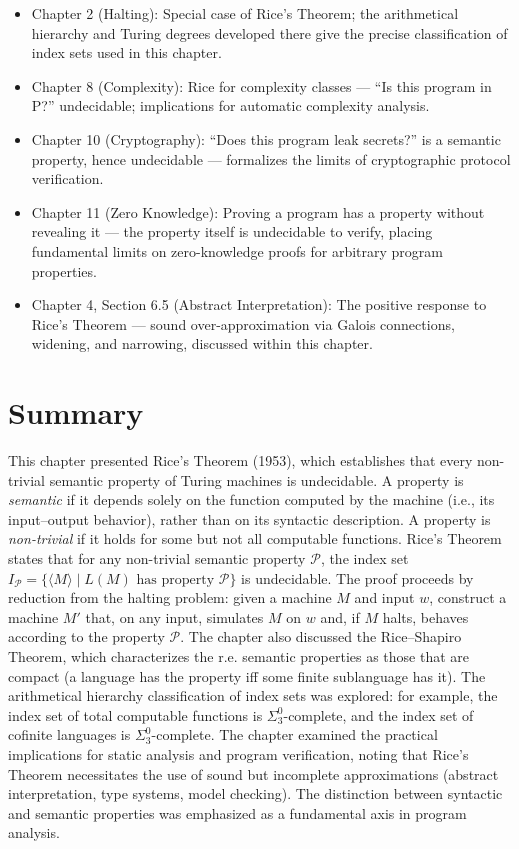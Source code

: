\begin{itemize}
\item Chapter 2 (Halting): Special case of Rice's Theorem; the arithmetical hierarchy and Turing degrees developed there give the precise classification of index sets used in this chapter.
\item Chapter 8 (Complexity): Rice for complexity classes --- ``Is this program in P?'' undecidable; implications for automatic complexity analysis.
\item Chapter 10 (Cryptography): ``Does this program leak secrets?'' is a semantic property, hence undecidable --- formalizes the limits of cryptographic protocol verification.
\item Chapter 11 (Zero Knowledge): Proving a program has a property without revealing it --- the property itself is undecidable to verify, placing fundamental limits on zero-knowledge proofs for arbitrary program properties.
\item Chapter 4, Section 6.5 (Abstract Interpretation): The positive response to Rice's Theorem --- sound over-approximation via Galois connections, widening, and narrowing, discussed within this chapter.
\end{itemize}

\section{Summary}
\label{sec:rice:summary}

This chapter presented Rice's Theorem (1953), which establishes that every non-trivial semantic property of Turing machines is undecidable. A property is \emph{semantic} if it depends solely on the function computed by the machine (i.e., its input--output behavior), rather than on its syntactic description. A property is \emph{non-trivial} if it holds for some but not all computable functions. Rice's Theorem states that for any non-trivial semantic property $\mathcal{P}$, the index set $I_{\mathcal{P}} = \{ \langle M \rangle \mid L(M) \text{ has property } \mathcal{P} \}$ is undecidable. The proof proceeds by reduction from the halting problem: given a machine $M$ and input $w$, construct a machine $M'$ that, on any input, simulates $M$ on $w$ and, if $M$ halts, behaves according to the property $\mathcal{P}$. The chapter also discussed the Rice--Shapiro Theorem, which characterizes the r.e. semantic properties as those that are compact (a language has the property iff some finite sublanguage has it). The arithmetical hierarchy classification of index sets was explored: for example, the index set of total computable functions is $\Sigma^0_3$-complete, and the index set of cofinite languages is $\Sigma^0_3$-complete. The chapter examined the practical implications for static analysis and program verification, noting that Rice's Theorem necessitates the use of sound but incomplete approximations (abstract interpretation, type systems, model checking). The distinction between syntactic and semantic properties was emphasized as a fundamental axis in program analysis.

